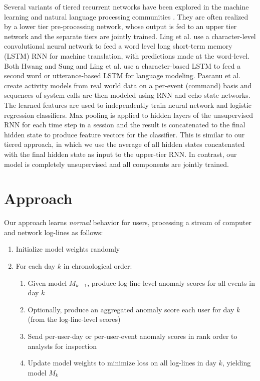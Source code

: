 \documentclass[letterpaper]{article} %
\begin{document}
Several variants of tiered recurrent networks have been explored in the machine learning and natural language processing communities \cite{koutnik2014clockwork,ling2015character,ling2015finding,chung2015gated}.
They are often realized by a lower tier pre-processing network, whose output is fed to an upper tier network and the separate tiers are jointly trained.
Ling et al.  use a character-level convolutional neural network to feed a word level long short-term memory (LSTM) RNN for machine translation, with predictions made at the word-level.
Both Hwang and Sung  and Ling et al.  use a character-based LSTM to feed a second word or utterance-based LSTM for language modeling.
Pascanu et al.  create activity models from real world data on a per-event (command) basis and sequences of system calls are then modeled using RNN and echo state networks.
The learned features are used to independently train neural network and logistic regression classifiers.
Max pooling is applied to hidden layers of the unsupervised RNN for each time step in a session and the result is concatenated to the final hidden state to produce feature vectors for the classifier.
This is similar to our tiered approach, in which we use the average of all hidden states concatenated with the final hidden state as input to the upper-tier RNN.
In contrast, our model is completely unsupervised and all components are jointly trained.

\section{Approach}

Our approach learns {\it normal} behavior for users, processing a stream of computer and network log-lines as follows:
\begin{enumerate}
    \item \setlength{\parskip}{-3pt} Initialize model weights randomly
    \item For each day $k$ in chronological order:
        \begin{enumerate}
            \item Given model $M_{k-1}$, produce log-line-level anomaly scores for all events in day $k$
            \item Optionally, produce an aggregated anomaly score each user for day $k$ (from the log-line-level scores)
            \item Send per-user-day or per-user-event anomaly scores in rank order to analysts for inspection
            \item Update model weights to minimize loss on all log-lines in day $k$, yielding model $M_k$
        \end{enumerate}
\end{enumerate}
\end{document}
